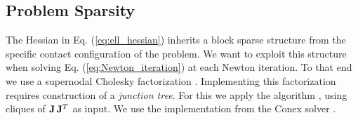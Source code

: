 \subsection{Problem Sparsity}
\label{sec:problem_sparsity}

The Hessian in Eq. (\ref{eq:ell_hessian}) inherits a block sparse structure from
the specific contact configuration of the problem. We want to exploit this
structure when solving Eq. (\ref{eq:Newton_iteration}) at each Newton iteration.
To that end we use a supernodal Cholesky factorization  \cite[\S
9]{bib:davis2016survey}. Implementing this factorization requires construction
of a \emph{junction tree}.  For this we apply the algorithm
\cite{bib:smail2017junction}, using cliques of ${\mathbf{J}}\,{\mathbf{J}}^T$ as input. We
use the implementation from the Conex solver \cite{bib:permenter2020}.

